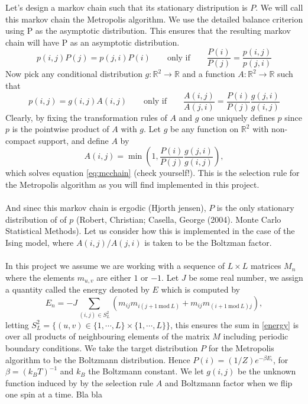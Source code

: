 \documentclass[11pt,english,a4paper]{article}
\begin{document}
Let's design a markov chain such that its stationary distripution is $P$. We will call this markov chain the Metropolis algorithm. We use the detailed balance criterion using P as the asymptotic distribution. This ensures that  the resulting markov chain will have P as an asymptotic distribution.
\[
p(i,j)P(j) = p(j,i)P(i) \qquad \text{only if} \qquad \frac{P(i)}{P(j)} = \frac{p(i,j)}{p(j,i)}
\]
Now pick any conditional distribution $g:\mathbb{R}^2 \to \mathbb{R}$ and a function $A: \mathbb{R}^2 \to \mathbb{R}$ such that
\begin{equation}
p(i,j) = g(i,j)A(i,j) \qquad \text{only if} \qquad \frac{A(i,j)}{A(j,i)} = \frac{P(i)}{P(j)} \frac{g(j,i)}{g(i,j)} \label{eq:mcchain}
\end{equation}
Clearly, by fixing the transformation rules of $A$ and $g$ one uniquely defines $p$ since $p$ is the pointwise product of $A$ with $g$. Let $g$ be any function on $\mathbb{R}^2$ with non-compact support, and define $A$ by
\begin{equation}
A(i,j) = \min \left( 1, \frac{P(i)}{P(j)} \frac{g(j,i)}{g(i,j)} \right),
\end{equation}
which solves equation \eqref{eq:mcchain} (check yourself!). This is the selection rule for the Metropolis algorithm as you will find implemented in this project.\\
\\
And sinec this markov chain is ergodic (Hjorth jensen), $P$ is the only stationary distribution of of $p$ (Robert, Christian; Casella, George (2004). Monte Carlo Statistical Methods). Let us consider how this is implemented in the case of the Ising model, where $A(i,j)/A(j,i)$ is taken to be the Boltzman factor.\\
\\
In this project we assume we are working with a sequence of $L \times L$ matrices $M_n$ where the elements $m_{u,v}$ are either $1$ or $-1$. Let $J$ be some real number, we assign a quantity called the energy denoted by $E$ which is computed by
\begin{equation}
E_n = -J \sum_{(i,j) \in S_L^2} (m_{ij} m_{i(j+1 \ \mathrm{mod} \ L)} + m_{ij} m_{(i+1 \ \mathrm{mod} \ L)j}), \label{energy}
\end{equation}
letting $S_L^2 = \big\{ (u,v) \in \{1,\cdots, L \}\times\{1,\cdots, L \} \big\}$, this ensures the sum in \eqref{energy} is over all products of neighbouring elements of the matrix $M$ including periodic boundary conditions. We take the target distribution $P$ for the Metropolis algorithm to be the Boltzmann distribution. Hence $P(i) = (1/Z) e^{ -\beta E_i}$, for $\beta = (k_B T)^{  -1}$ and $k_B$ the Boltzmann constant. We let $g(i,j)$ be the unknown function induced by by the selection rule $A$ and Boltzmann factor when we flip one spin at a time. Bla bla\\
\end{document}
